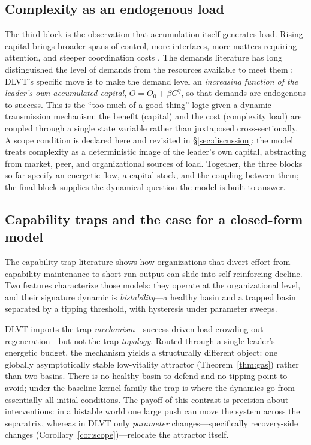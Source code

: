 \subsection{Complexity as an endogenous load}
\label{sec:foundations-complexity}

The third block is the observation that accumulation itself generates load.
Rising capital brings broader spans of control, more interfaces, more
matters requiring attention, and steeper coordination costs
\citep{garicano2000hierarchies,ocasio1997towards,hambrick2005executive,zhu2022executive}.
The demands literature has long distinguished the level of demands from the
resources available to meet them
\citep{karasek1979job,demerouti2001job,podsakoff2023challenge}; DLVT's
specific move is to make the demand level an \emph{increasing function of
the leader's own accumulated capital}, $O = O_0 + \beta C^{\eta}$, so that
demands are endogenous to success. This is the ``too-much-of-a-good-thing''
logic \citep{pierce2013tmgt} given a dynamic transmission mechanism: the
benefit (capital) and the cost (complexity load) are coupled through a
single state variable rather than juxtaposed cross-sectionally. A scope
condition is declared here and revisited in \S\ref{sec:discussion}: the
model treats complexity as a deterministic image of the leader's own
capital, abstracting from market, peer, and organizational sources of
load. Together, the three blocks so far specify an energetic flow, a
capital stock, and the coupling between them; the final block supplies the
dynamical question the model is built to answer.

\subsection{Capability traps and the case for a closed-form model}
\label{sec:foundations-traps}

The capability-trap literature
\citep{repenning2001nobody,repenning2002capability,repenning2002simulation,rahmandad2016capability}
shows how organizations that divert effort from capability maintenance to
short-run output can slide into self-reinforcing decline. Two features
characterize those models: they operate at the organizational level, and
their signature dynamic is \emph{bistability}---a healthy basin and a
trapped basin separated by a tipping threshold, with hysteresis under
parameter sweeps.

DLVT imports the trap \emph{mechanism}---success-driven load crowding out
regeneration---but not the trap \emph{topology}. Routed through a single
leader's energetic budget, the mechanism yields a structurally different
object: one globally asymptotically stable low-vitality attractor
(Theorem~\ref{thm:gas}) rather than two basins. There is no healthy basin
to defend and no tipping point to avoid; under the baseline kernel family
the trap is where the dynamics go from essentially all initial conditions.
The payoff of this contrast is precision about interventions: in a
bistable world one large push can move the system across the separatrix,
whereas in DLVT only \emph{parameter} changes---specifically recovery-side
changes (Corollary~\ref{cor:scope})---relocate the attractor itself.


